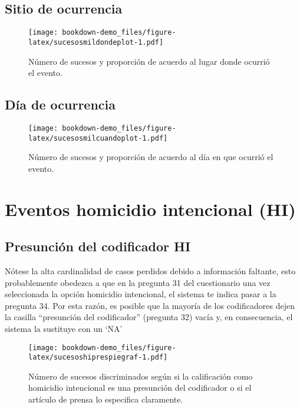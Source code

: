\documentclass[
]{book}
\begin{document}
\hypertarget{sitio-de-ocurrencia}{%
\section{Sitio de ocurrencia}\label{sitio-de-ocurrencia}}



\begin{figure}
\centering
\texttt{[image: bookdown-demo\_files/figure-latex/sucesosmildondeplot-1.pdf]}
\caption{\label{fig:sucesosmildondeplot}Número de sucesos y proporción de acuerdo al lugar donde ocurrió el evento.}
\end{figure}

\hypertarget{duxeda-de-ocurrencia}{%
\section{Día de ocurrencia}\label{duxeda-de-ocurrencia}}



\begin{figure}
\centering
\texttt{[image: bookdown-demo\_files/figure-latex/sucesosmilcuandoplot-1.pdf]}
\caption{\label{fig:sucesosmilcuandoplot}Número de sucesos y proporción de acuerdo al día en que ocurrió el evento.}
\end{figure}

\hypertarget{eventos-homicidio-intencional-hi}{%
\chapter{Eventos homicidio intencional (HI)}\label{eventos-homicidio-intencional-hi}}

\hypertarget{presunciuxf3n-del-codificador-hi}{%
\section{Presunción del codificador HI}\label{presunciuxf3n-del-codificador-hi}}

Nótese la alta cardinalidad de casos perdidos debido a información faltante, esto probablemente obedezca a que en la pregunta 31 del cuestionario una vez seleccionada la opción homicidio intencional, el sistema te indica pasar a la pregunta 34. Por esta razón, es posible que la mayoría de los codificadores dejen la casilla ``presunción del codificador'' (pregunta 32) vacía y, en consecuencia, el sistema la sustituye con un `NA'



\begin{figure}
\centering
\texttt{[image: bookdown-demo\_files/figure-latex/sucesoshiprespiegraf-1.pdf]}
\caption{\label{fig:sucesoshiprespiegraf}Número de sucesos discriminados según si la calificación como homicidio intencional es una presunción del codificador o si el artículo de prensa lo especifica claramente.}
\end{figure}
\end{document}
